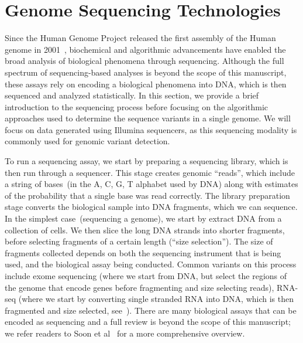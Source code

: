\documentclass[phd]{ucbthesis}
\begin{document}
\section{Genome Sequencing Technologies}
\label{sec:genome-sequencing}

Since the Human Genome Project released the first assembly of the Human genome
in 2001~\cite{lander01}, biochemical and algorithmic advancements have enabled
the broad analysis of biological phenomena through sequencing. Although the
full spectrum of sequencing-based analyses is beyond the scope of this
manuscript, these assays rely on encoding a biological phenomena into DNA, which
is then sequenced and analyzed statistically. In this section, we provide a
brief introduction to the sequencing process before focusing on the algorithmic
approaches used to determine the sequence variants in a single genome. We will
focus on data generated using Illumina sequencers, as this sequencing modality
is commonly used for genomic variant detection.

To run a sequencing assay, we start by preparing a sequencing library, which is
then run through a sequencer. This stage creates genomic ``reads'', which
include a string of bases~(in the A, C, G, T alphabet used by DNA) along with
estimates of the probability that a single base was read correctly. The library
preparation stage converts the biological sample into DNA fragments, which we
can sequence. In the simplest case~(sequencing a genome), we start by extract
DNA from a collection of cells. We then slice the long DNA strands into shorter
fragments, before selecting fragments of a certain length (``size selection'').
The size of fragments collected depends on both the sequencing instrument that
is being used, and the biological assay being conducted. Common variants on this
process include exome sequencing (where we start from DNA, but select the regions
of the genome that encode genes before fragmenting and size selecting reads),
RNA-seq (where we start by converting single stranded RNA into DNA, which is
then fragmented and size selected, see~\cite{mortazavi08}). There are many
biological assays that can be encoded as sequencing and a full review is beyond
the scope of this manuscript; we refer readers to Soon et al~\cite{soon13} for a
more comprehensive overview.
\end{document}
